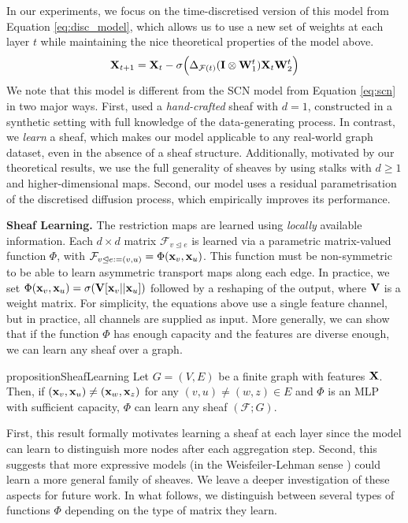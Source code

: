 \documentclass{article}
\def\vx{{\bf{x}}}
\def\mI{{\bf{I}}}
\def\mV{{\bf{V}}}
\def\mW{{\bf{W}}}
\def\mX{{\bf{X}}}
\def\gF{{\mathcal{F}}}
\newcommand{\tleq}{\trianglelefteq}
\begin{document}
In our experiments, we focus on the time-discretised version of this model from Equation \ref{eq:disc_model}, which allows us to use a new set of weights at each layer $t$ while maintaining the nice theoretical properties of the model above. 
\begin{equation}\label{eq:disc_model}
    \mX_{t+1} = \mX_{t} - \sigma \Big(\Delta_{\gF(t)} (\mI \otimes \mW_1^t) \mX_t \mW_2^t \Big)
\end{equation}
We note that this model is different from the SCN model from Equation \ref{eq:scn} in two major ways. First, \citet{hansen2020sheaf} used a \emph{hand-crafted} sheaf with $d=1$, constructed in a synthetic setting with full knowledge of the data-generating process. In contrast, we \emph{learn} a sheaf, which makes our model applicable to any real-world graph dataset, even in the absence of a sheaf structure. Additionally, motivated by our theoretical results, we use the full generality of sheaves by using stalks with $d \geq 1$ and higher-dimensional maps. Second, our model uses a residual parametrisation of the discretised diffusion process, which empirically improves its performance. 

\textbf{Sheaf Learning. } The restriction maps are learned using \emph{locally} available information. Each $d \times d$ matrix $\gF_{v \tleq e}$ is learned via a parametric matrix-valued function $\Phi$, with $\gF_{v \tleq e := (v, u)} = \Phi(\vx_v, \vx_u)$. 
This function must be non-symmetric to be able to learn asymmetric transport maps along each edge. 
In practice, we set $\Phi(\vx_v, \vx_u) = \sigma(\mV [\vx_v || \vx_u])$ followed by a reshaping of the output, where $\mV$ is a weight matrix. For simplicity, the equations above use a single feature channel, but in practice, all channels are supplied as input. More generally, we can show that if the function $\Phi$ has enough capacity and the features are diverse enough, we can learn any sheaf over a graph. 

\begin{restatable}{proposition}{SheafLearning}\label{prop:sheaf_learning}
Let $G = (V, E)$ be a finite graph with features $\mX$. Then, if $(\vx_v, \vx_u) \neq (\vx_w, \vx_z)$ for any $(v, u) \neq (w, z) \in E$ and $\Phi$ is an MLP with sufficient capacity, $\Phi$ can learn any sheaf $(\gF; G)$. 
\end{restatable}

First, this result formally motivates learning a sheaf at each layer since the model can learn to distinguish more nodes after each aggregation step. Second, this suggests that more expressive models (in the Weisfeiler-Lehman sense \citep{gin, morris2019weisfeiler, pmlr-v139-bodnar21a, bodnar2021b}) could learn a more general family of sheaves. We leave a deeper investigation of these aspects for future work. In what follows, we distinguish between several types of functions $\Phi$ depending on the type of matrix they learn.
\end{document}
